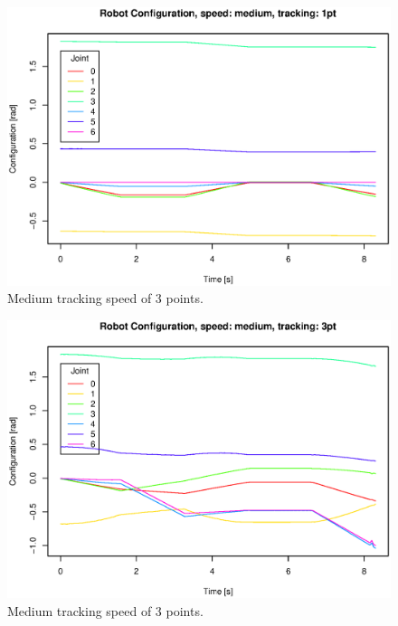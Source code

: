 \begin{figure}[H]
\centering
\includegraphics[width= \fullImageWidth]{graphics/robotics/robotConfiguration_medium_1pt}
\caption{Medium tracking speed of 3 points.}
\label{fig:robotic_conf_medium_1pt}
\end{figure}

\begin{figure}[H]
\centering
\includegraphics[width= \fullImageWidth]{graphics/robotics/robotConfiguration_medium_3pt}
\caption{Medium tracking speed of 3 points.}
\label{fig:robotic_conf_medium_3pt}
\end{figure}

